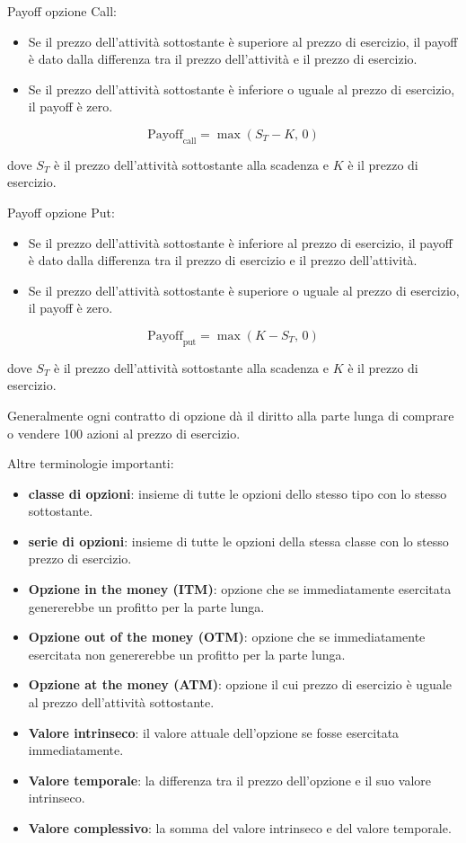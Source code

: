 \documentclass[12pt,a4paper]{report}
\begin{document}
Payoff opzione Call:
\begin{itemize}
    \item Se il prezzo dell'attività sottostante è superiore al prezzo di esercizio, il payoff è dato dalla differenza tra il prezzo dell'attività e il prezzo di esercizio.
    \item Se il prezzo dell'attività sottostante è inferiore o uguale al prezzo di esercizio, il payoff è zero.
\end{itemize}

\[
\mathrm{Payoff}_{\mathrm{call}} = \max(S_T - K,\, 0)
\]

dove \( S_T \) è il prezzo dell'attività sottostante alla scadenza e \( K \) è il prezzo di esercizio.

Payoff opzione Put:
\begin{itemize}
    \item Se il prezzo dell'attività sottostante è inferiore al prezzo di esercizio, il payoff è dato dalla differenza tra il prezzo di esercizio e il prezzo dell'attività.
    \item Se il prezzo dell'attività sottostante è superiore o uguale al prezzo di esercizio, il payoff è zero.
\end{itemize}

\[
\mathrm{Payoff}_{\mathrm{put}} = \max(K - S_T,\, 0)
\]

dove \( S_T \) è il prezzo dell'attività sottostante alla scadenza e \( K \) è il prezzo di esercizio.

Generalmente ogni contratto di opzione dà il diritto alla parte lunga di comprare o vendere 100 azioni al prezzo di esercizio.

Altre terminologie importanti:
\begin{itemize}
    \item \textbf{classe di opzioni}: insieme di tutte le opzioni dello stesso tipo con lo stesso sottostante.
    \item \textbf{serie di opzioni}: insieme di tutte le opzioni della stessa classe con lo stesso prezzo di esercizio.
    \item \textbf{Opzione in the money (ITM)}: opzione che se immediatamente esercitata genererebbe un profitto per la parte lunga.
    \item \textbf{Opzione out of the money (OTM)}: opzione che se immediatamente esercitata non genererebbe un profitto per la parte lunga.
    \item \textbf{Opzione at the money (ATM)}: opzione il cui prezzo di esercizio è uguale al prezzo dell'attività sottostante.
    \item \textbf{Valore intrinseco}: il valore attuale dell'opzione se fosse esercitata immediatamente.
    \item \textbf{Valore temporale}: la differenza tra il prezzo dell'opzione e il suo valore intrinseco.
    \item \textbf{Valore complessivo}: la somma del valore intrinseco e del valore temporale.
\end{itemize}
\newpage
\end{document}
